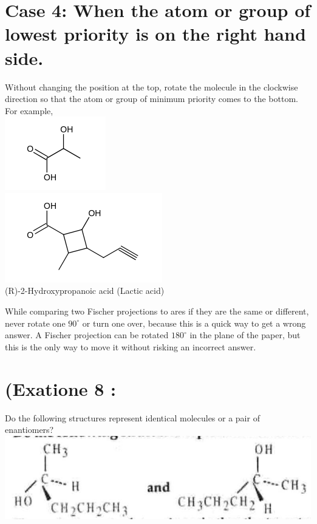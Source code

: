 \documentclass[10pt]{article}
\begin{document}
\section*{Case 4: When the atom or group of lowest priority is on the right hand side.}
Without changing the position at the top, rotate the molecule in the clockwise direction so that the atom or group of minimum priority comes to the bottom. For example,\\
\includegraphics{smile-3ec927550ed366f24cece5c3ae930d4ecb401436}\\
\includegraphics{smile-56abfea8e621c9a62ad6d20895631065a89db87d}\\
(R)-2-Hydroxypropanoic acid (Lactic acid)

While comparing two Fischer projections to ares if they are the same or different, never rotate one $90^{\circ}$ or turn one over, because this is a quick way to get a wrong answer. A Fischer projection can be rotated $180^{\circ}$ in the plane of the paper, but this is the only way to move it without risking an incorrect answer.

\section*{(Exatione 8 :}
Do the following structures represent identical molecules or a pair of enantiomers?\\
\includegraphics[max width=\textwidth, center]{2025_01_28_8470952b98110cec3aabg-055}
\end{document}
